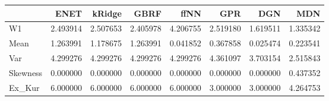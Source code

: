 \begin{tabular}{lrrrrrrr}
\toprule
{} &      ENET &    kRidge &      GBRF &      ffNN &       GPR &       DGN &       MDN \\
\midrule
W1       &  2.493914 &  2.507653 &  2.405978 &  4.206755 &  2.519180 &  1.619511 &  1.335342 \\
Mean     &  1.263991 &  1.178675 &  1.263991 &  0.041852 &  0.367858 &  0.025474 &  0.223541 \\
Var      &  4.299276 &  4.299276 &  4.299276 &  4.299276 &  4.361097 &  3.703154 &  2.515843 \\
Skewness &  0.000000 &  0.000000 &  0.000000 &  0.000000 &  0.000000 &  0.000000 &  0.437352 \\
Ex\_Kur   &  6.000000 &  6.000000 &  6.000000 &  6.000000 &  3.000000 &  3.000000 &  4.264753 \\
\bottomrule
\end{tabular}
